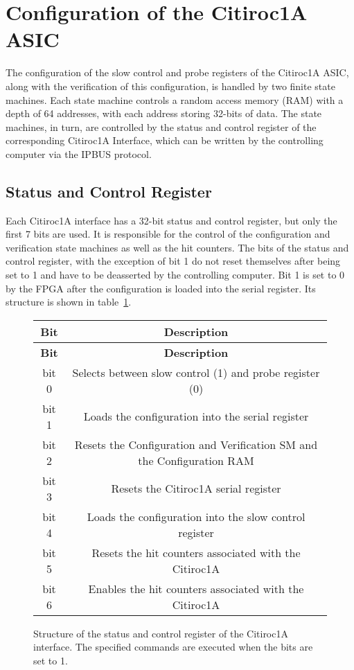 \section{Configuration of the Citiroc1A ASIC}

The configuration of the slow control and probe registers of the Citiroc1A ASIC,
along with the verification of this configuration, is handled by two finite state machines.
\newline
Each state machine controls a random access memory (RAM) with a depth of 64 addresses,
with each address storing 32-bits of data.
\newline
The state machines, in turn, are controlled by the status and control register of the corresponding Citiroc1A Interface, which can be written by the controlling computer via the IPBUS protocol.
\subsection{Status and Control Register}
Each Citiroc1A interface has a 32-bit status and control register, but only the first 7 bits are used.
It is responsible for the control of the configuration and verification state machines as well as the hit counters.
The bits of the status and control register, with the exception of bit 1
do not reset themselves after being set to 1 and have to be deasserted by the controlling computer.
\newline
Bit 1 is set to 0 by the FPGA after the configuration is loaded into the serial register.
\newline
Its structure is shown in table~\ref{tab:status_control_register}.
\begin{figure}[H]
    \centering
\begin{longtable}{|c|c|}
    \hline
    \textbf{Bit} & \textbf{Description} \\
    \hline
    \endfirsthead
    
    \hline
    \textbf{Bit} & \textbf{Description} \\
    \hline
    \endhead
    
    \hline
    \endfoot
    
    \hline
    \endlastfoot
    bit 0 & Selects between slow control (1) and probe register (0) \\
    bit 1 & Loads the configuration into the serial register\\
    bit 2 & Resets the Configuration and Verification SM and the Configuration RAM \\
    bit 3 & Resets the  Citiroc1A serial register \\
    bit 4 & Loads the configuration into the slow control register \\
    bit 5 & Resets the hit counters associated with the Citiroc1A \\
    bit 6 & Enables the hit counters associated with the Citiroc1A \\
    \hline
    \end{longtable}
    \caption{Structure of the status and control register of the Citiroc1A interface. 
    The specified commands are executed when the bits are set to 1. }  
    \label{tab:status_control_register}
\end{figure}  
  
